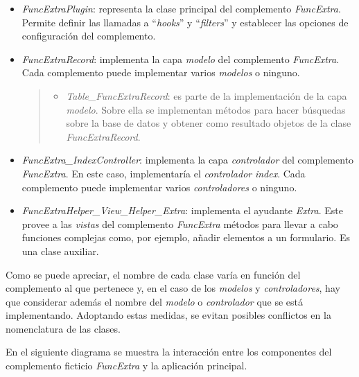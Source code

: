 \begin{itemize}
\tightlist
\item
  \emph{FuncExtraPlugin}: representa la clase principal del complemento
  \emph{FuncExtra}. Permite definir las llamadas a ``\emph{hooks}'' y
  ``\emph{filters}'' y establecer las opciones de configuración del
  complemento.
\item
  \emph{FuncExtraRecord}: implementa la capa \emph{modelo} del
  complemento \emph{FuncExtra}. Cada complemento puede implementar
  varios \emph{modelos} o ninguno.

  \begin{quote}
  \begin{itemize}
  \tightlist
  \item
    \emph{Table\_FuncExtraRecord}: es parte de la implementación de la
    capa \emph{modelo}. Sobre ella se implementan métodos para hacer
    búsquedas sobre la base de datos y obtener como resultado objetos de
    la clase \emph{FuncExtraRecord}.
  \end{itemize}
  \end{quote}
\item
  \emph{FuncExtra\_IndexController}: implementa la capa
  \emph{controlador} del complemento \emph{FuncExtra}. En este caso,
  implementaría el \emph{controlador} \emph{index}. Cada complemento
  puede implementar varios \emph{controladores} o ninguno.
\item
  \emph{FuncExtraHelper\_View\_Helper\_Extra}: implementa el ayudante
  \emph{Extra}. Este provee a las \emph{vistas} del complemento
  \emph{FuncExtra} métodos para llevar a cabo funciones complejas como,
  por ejemplo, añadir elementos a un formulario. Es una clase auxiliar.
\end{itemize}


Como se puede apreciar, el nombre de cada clase varía en función del
complemento al que pertenece y, en el caso de los \emph{modelos} y
\emph{controladores}, hay que considerar además el nombre del
\emph{modelo} o \emph{controlador} que se está implementando. Adoptando
estas medidas, se evitan posibles conflictos en la nomenclatura de las
clases.

En el siguiente diagrama se muestra la interacción entre los componentes
del complemento ficticio \emph{FuncExtra} y la aplicación principal.


